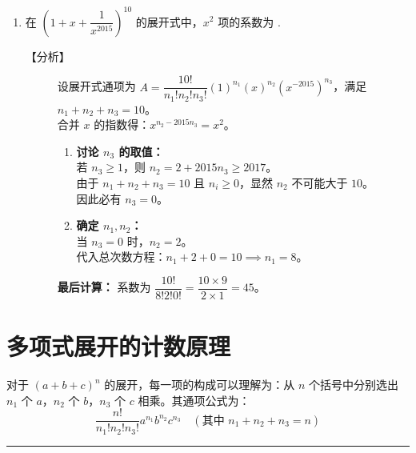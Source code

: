 \documentclass[11pt,a4paper]{article}
\newlength{\myspace}             %
\begin{document}
\begin{enumerate}[label=\arabic*., start=6, leftmargin=1.5em]
    \vspace{\myspace}

    \item 在 $\left( 1 + x + \dfrac{1}{x^{2015}} \right)^{10}$ 的展开式中，$x^2$ 项的系数为 \underline{\hspace{2cm}}. 
    
    \begin{description}
        \item[【分析】] 
        设展开式通项为 $A = \dfrac{10!}{n_1! n_2! n_3!} (1)^{n_1} (x)^{n_2} (x^{-2015})^{n_3}$，满足 $n_1+n_2+n_3=10$。\\
        合并 $x$ 的指数得：$x^{n_2 - 2015n_3} = x^2$。
        \begin{enumerate}[label=\textcircled{\small\arabic*}]
            \item \textbf{讨论 $n_3$ 的取值：} \\
            若 $n_3 \geq 1$，则 $n_2 = 2 + 2015n_3 \geq 2017$。\\
            由于 $n_1+n_2+n_3=10$ 且 $n_i \geq 0$，显然 $n_2$ 不可能大于 $10$。\\
            因此必有 $n_3 = 0$。
            \item \textbf{确定 $n_1, n_2$：} \\
            当 $n_3=0$ 时，$n_2 = 2$。\\
            代入总次数方程：$n_1 + 2 + 0 = 10 \implies n_1 = 8$。
        \end{enumerate}
        \textbf{最后计算：} 系数为 $\dfrac{10!}{8! 2! 0!} = \dfrac{10 \times 9}{2 \times 1} = 45$。
    \end{description}

\end{enumerate}



\section{多项式展开的计数原理}

对于 $(a + b + c)^n$ 的展开，每一项的构成可以理解为：从 $n$ 个括号中分别选出 $n_1$ 个 $a$，$n_2$ 个 $b$，$n_3$ 个 $c$ 相乘。其通项公式为：
\[ \frac{n!}{n_1! n_2! n_3!} a^{n_1} b^{n_2} c^{n_3} \quad (\text{其中 } n_1 + n_2 + n_3 = n) \]

\medskip
\hrule
\medskip
\vspace{\myspace}
\end{document}
